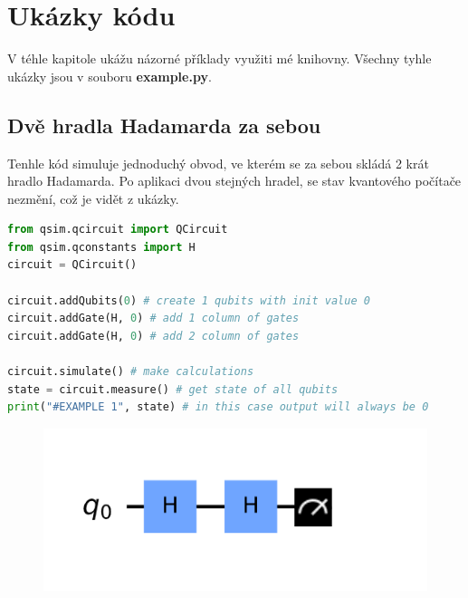 \documentclass[11pt]{article}
\begin{document}
\newpage

\section{Ukázky kódu}
V téhle kapitole ukážu názorné příklady využiti mé knihovny.
Všechny tyhle ukázky jsou v souboru \textbf{example.py}.

\subsection{Dvě hradla Hadamarda za sebou}
Tenhle kód simuluje jednoduchý obvod, ve kterém se za sebou skládá 2 krát hradlo Hadamarda.
Po aplikaci dvou stejných hradel, se stav kvantového počítače nezmění, což je vidět z ukázky.
\begin{lstlisting}[language=Python, caption=Double Hadamard gates]
from qsim.qcircuit import QCircuit
from qsim.qconstants import H
circuit = QCircuit()

circuit.addQubits(0) # create 1 qubits with init value 0
circuit.addGate(H, 0) # add 1 column of gates
circuit.addGate(H, 0) # add 2 column of gates

circuit.simulate() # make calculations
state = circuit.measure() # get state of all qubits
print("#EXAMPLE 1", state) # in this case output will always be 0
\end{lstlisting}
\begin{figure}[H]
    \includegraphics[scale=.5]{two_h_gates_scheme}
    \centering
\end{figure}
\end{document}
